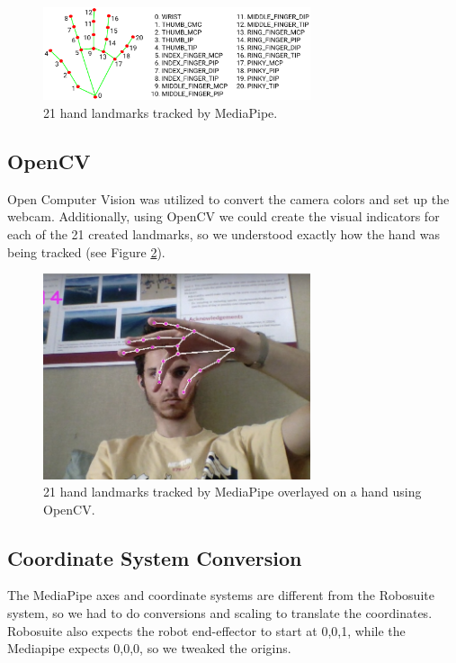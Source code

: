 \documentclass{article}
\begin{document}
\begin{figure}[H]
  \centering
  \includegraphics[width=0.7\textwidth]{hand_landmarks.png}
  \caption{21 hand landmarks tracked by MediaPipe.}
  \label{fig:hand-landmarks}
\end{figure}
\subsection{OpenCV}
Open Computer Vision was utilized to convert the camera colors and set up the
webcam. Additionally, using OpenCV we could create the visual indicators for
each of the 21 created landmarks, so we understood exactly how the hand was
being tracked (see Figure \ref{fig:hand-landmarks-webcam}).
\begin{figure}[H]
  \centering
  \includegraphics[width=0.7\textwidth]{hand-landmarks-webcam.jpeg}
  \caption{21 hand landmarks tracked by MediaPipe overlayed on a hand using OpenCV.}
  \label{fig:hand-landmarks-webcam}
\end{figure}
\subsection{Coordinate System Conversion}
The MediaPipe axes and coordinate systems are different from the Robosuite
system, so we had to do conversions and scaling to translate the coordinates.
Robosuite also expects the robot end-effector to start at 0,0,1, while the
Mediapipe expects 0,0,0, so we tweaked the origins. 
\end{document}
